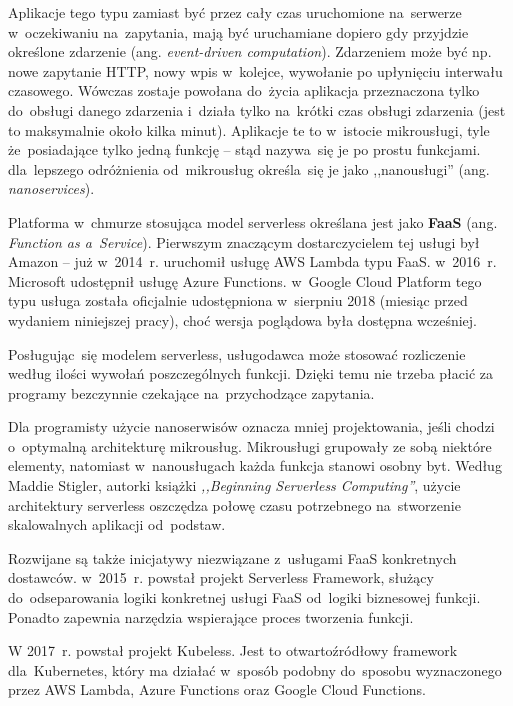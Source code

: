 \documentclass[12pt,a4paper,twoside,titlepage,openright]{book}
\begin{document}
Aplikacje tego typu zamiast być przez cały czas uruchomione na~serwerze w~oczekiwaniu na~zapytania, mają być uruchamiane dopiero gdy przyjdzie określone zdarzenie (ang. \textit{event-driven computation}). Zdarzeniem może być np. nowe zapytanie HTTP, nowy wpis w~kolejce, wywołanie po upłynięciu interwału czasowego. Wówczas zostaje powołana do~życia aplikacja przeznaczona tylko do~obsługi danego zdarzenia i~działa tylko na~krótki czas obsługi zdarzenia (jest to maksymalnie około kilka minut). Aplikacje te to w~istocie mikrousługi, tyle że~posiadające tylko jedną funkcję -- stąd nazywa~się je po prostu funkcjami. dla~lepszego odróżnienia od~mikrousług określa~się je jako ,,nanousługi'' (ang. \textit{nanoservices}). \cite{serverlessMaddie, ccResearchSpringer, distributedSystems}

Platforma w~chmurze stosująca model serverless określana jest jako \textbf{FaaS} (ang. \textit{Function as a~Service}). Pierwszym znaczącym dostarczycielem tej usługi był Amazon -- już w~2014~r. uruchomił usługę AWS Lambda typu FaaS. w~2016~r. Microsoft udostępnił usługę Azure Functions. w~Google Cloud Platform tego typu usługa została oficjalnie udostępniona w~sierpniu 2018 (miesiąc przed wydaniem niniejszej pracy), choć wersja poglądowa była dostępna wcześniej. 

Posługując~się modelem serverless, usługodawca może stosować rozliczenie według ilości wywołań poszczególnych funkcji. Dzięki temu nie trzeba płacić za programy bezczynnie czekające na~przychodzące zapytania.

Dla programisty użycie nanoserwisów oznacza mniej projektowania, jeśli chodzi o~optymalną architekturę mikrousług. Mikrousługi grupowały ze sobą niektóre elementy, natomiast w~nanousługach każda funkcja stanowi osobny byt. Według Maddie Stigler, autorki książki \textit{,,Beginning Serverless Computing''}, użycie architektury serverless oszczędza połowę czasu potrzebnego na~stworzenie skalowalnych aplikacji od~podstaw.\cite{serverlessMaddie}

Rozwijane są także inicjatywy niezwiązane z~usługami FaaS konkretnych dostawców. w~2015~r. powstał projekt Serverless Framework,\cite{siteServerlessFramework} służący do~odseparowania logiki konkretnej usługi FaaS od~logiki biznesowej funkcji. Ponadto zapewnia narzędzia wspierające proces tworzenia funkcji. 

W 2017~r. powstał projekt Kubeless.\cite{siteKubelessReleases} Jest to otwartoźródłowy framework dla~Kubernetes, który ma działać w~sposób podobny do~sposobu wyznaczonego przez AWS Lambda, Azure Functions oraz Google Cloud Functions.\cite{distributedSystems} 
\end{document}
